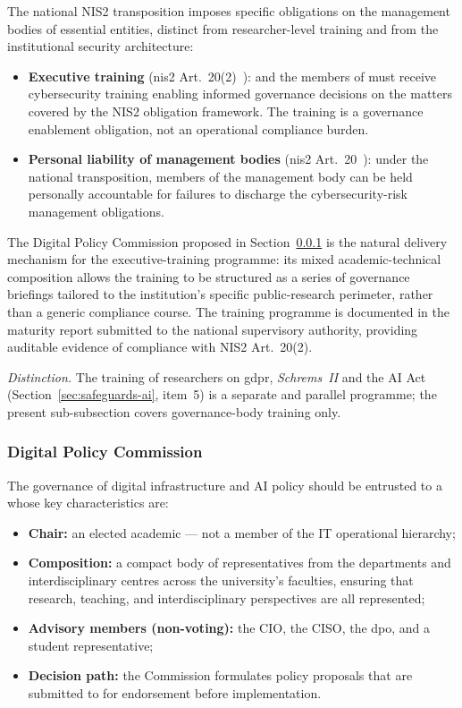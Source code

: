 The national NIS2 transposition imposes specific obligations on
the management bodies of essential entities, distinct from
researcher-level training and from the institutional security
architecture:
\begin{itemize}[nosep]
    \item \textbf{Executive training} (\gls{nis2}
    Art.~20(2)~\cite{nis2}):  and the
    members of  must receive cybersecurity
    training enabling informed governance decisions on the matters
    covered by the NIS2 obligation framework. The training is a
    governance enablement obligation, not an operational compliance
    burden.
    \item \textbf{Personal liability of management bodies}
    (\gls{nis2} Art.~20~\cite{nis2}): under the national
    transposition, members of the management body
    can be held personally accountable for failures to discharge
    the cybersecurity-risk management obligations.
\end{itemize}

\noindent The Digital Policy Commission proposed in
Section~\ref{sec:dpc} is the natural delivery mechanism for the
executive-training programme: its mixed academic-technical
composition allows the training to be structured as a series of
governance briefings tailored to the institution's specific
public-research perimeter, rather than a generic compliance course.
The training programme is documented in the maturity report
submitted to the national supervisory authority, providing
auditable evidence of compliance with NIS2 Art.~20(2).

\noindent\textit{Distinction.} The training of researchers on
\gls{gdpr}, \emph{Schrems~II} and the AI Act
(Section~\ref{sec:safeguards-ai}, item~5) is a separate and
parallel programme; the present sub-subsection covers
governance-body training only.

\subsubsection{Digital Policy Commission}
\label{sec:dpc}

The governance of digital infrastructure and AI policy should be
entrusted to a  whose key
characteristics are:
\begin{itemize}[nosep]
    \item \textbf{Chair:} an elected academic --- not a member of
    the IT operational hierarchy;
    \item \textbf{Composition:} a compact body of representatives
    from the departments and interdisciplinary centres across the
    university's faculties, ensuring that research, teaching, and
    interdisciplinary perspectives are all represented;
    \item \textbf{Advisory members (non-voting):} the CIO, the CISO,
    the \gls{dpo}, and a student representative;
    \item \textbf{Decision path:} the Commission formulates policy
    proposals that are submitted to 
    for endorsement before implementation.
\end{itemize}

